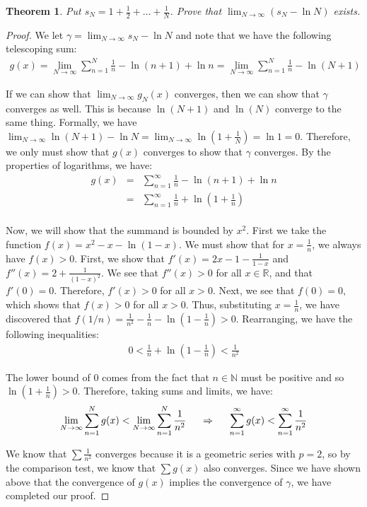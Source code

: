 \documentclass[psamsfonts]{amsart}
\newtheorem{thm}{Theorem}[section]
\theoremstyle{definition}
\theoremstyle{remark}
\numberwithin{equation}{section}
\begin{document}
\begin{thm}
Put $s_N = 1 + \frac{1}{2} + \ldots + \frac{1}{N}$. Prove that $\lim_{N \to \infty} (s_N - \ln N)$ exists. 
\end{thm}

\begin{proof}
We let $\gamma = \lim_{N \to \infty} s_N - \ln N$ and note that we have the following telescoping sum:
\begin{eqnarray}
g(x) = \lim_{N \to \infty} \sum_{n=1}^N \frac{1}{n} - \ln( n+1) + \ln n = \lim_{N \to \infty} \sum_{n=1}^N \frac{1}{n} - \ln(N+1)
\end{eqnarray}

If we can show that $\lim_{N \to \infty} g_N (x)$ converges, then we can show that $\gamma$ converges as well. This is because $\ln(N+1)$ and $\ln(N)$ converge to the same thing. Formally, we have $\lim_{N \to \infty} \ln(N+1) - \ln N = \lim_{N \to \infty} \ln(1 + \frac{1}{N} ) = \ln 1 = 0$. Therefore, we only must show that $g(x)$ converges to show that $\gamma$ converges. By the properties of logarithms, we have:
\begin{eqnarray}
g(x) &=& \sum_{n=1}^\infty \frac{1}{n} - \ln(n+1) + \ln n \\
&=& \sum_{n=1}^\infty \frac{1}{n} + \ln \left(1 + \frac{1}{n} \right) \\
\end{eqnarray}

Now, we will show that the summand is bounded by $x^2$. First we take the function $f(x) = x^2 - x - \ln( 1- x)$. We must show that for $x = \frac{1}{n}$, we always have $f(x) > 0$. First, we show that $f'(x) = 2x - 1 - \frac{1}{1-x}$ and $f''(x) = 2 + \frac{1}{(1-x)^2}$. We see that $f''(x) > 0$ for all $x \in \mathbb{R}$, and that $f'(0) = 0$. Therefore, $f'(x) > 0$ for all $x > 0$. Next, we see that $f(0) = 0$, which shows that $f(x) > 0$ for all $x > 0$. Thus, substituting $x = \frac{1}{n}$, we have discovered that $f(1/n) = \frac{1}{n^2} - \frac{1}{n} - \ln(1 - \frac{1}{n} ) > 0$. Rearranging, we have the following inequalities:
\begin{eqnarray}
0 < \frac{1}{n} + \ln \left(1 - \frac{1}{n} \right) < \frac{1}{n^2}
\end{eqnarray}

The lower bound of $0$ comes from the fact that $n \in \mathbb{N}$ must be positive and so $\ln(1 + \frac{1}{n}) > 0$. Therefore, taking sums and limits, we have:
\begin{eqnarray}
\lim_{N \to \infty} \sum_{n=1}^N g(x) < \lim_{N \to \infty} \sum_{n=1}^N \frac{1}{n^2} \hspace{0.5cm} \Rightarrow \hspace{0.5cm} \sum_{n=1}^\infty g(x) < \sum_{n=1}^\infty \frac{1}{n^2} 
\end{eqnarray} 

We know that $\sum \frac{1}{n^2}$ converges because it is a geometric series with $p = 2$, so by the comparison test, we know that $\sum g(x)$ also converges. Since we have shown above that the convergence of $g(x)$ implies the convergence of $\gamma$, we have completed our proof.
\end{proof}
\end{document}

